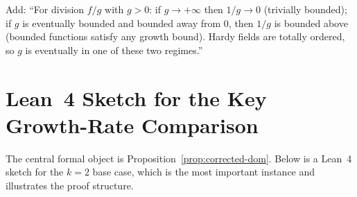 \documentclass[12pt,a4paper]{article}
\theoremstyle{definition}
\theoremstyle{remark}
\begin{document}
Add: ``For division $f/g$ with $g>0$: if $g\to+\infty$ then $1/g\to 0$
(trivially bounded); if $g$ is eventually bounded and bounded away from $0$,
then $1/g$ is bounded above (bounded functions satisfy any growth bound).
Hardy fields are totally ordered, so $g$ is eventually in one of these
two regimes.''

\section{Lean~4 Sketch for the Key Growth-Rate Comparison}

The central formal object is Proposition~\ref{prop:corrected-dom}.
Below is a Lean~4 sketch for the $k=2$ base case, which is the most important
instance and illustrates the proof structure.
\end{document}
